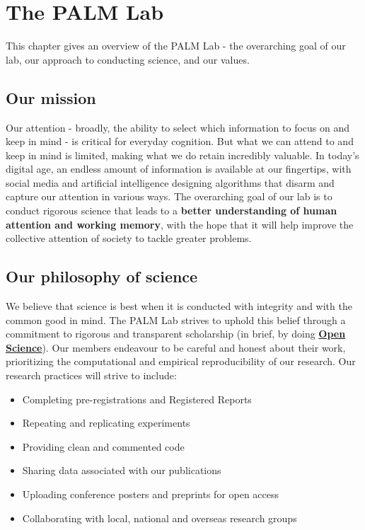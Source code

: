 \documentclass[
]{book}
\providecommand{\tightlist}{%
  \setlength{\itemsep}{0pt}\setlength{\parskip}{0pt}}
\begin{document}
\hypertarget{the-lab}{%
\chapter{The PALM Lab}\label{the-lab}}

This chapter gives an overview of the PALM Lab - the overarching goal of our lab, our approach to conducting science, and our values.

\hypertarget{lab-mission}{%
\section{Our mission}\label{lab-mission}}

Our attention - broadly, the ability to select which information to focus on and keep in mind - is critical for everyday cognition. But what we can attend to and keep in mind is limited, making what we do retain incredibly valuable. In today's digital age, an endless amount of information is available at our fingertips, with social media and artificial intelligence designing algorithms that disarm and capture our attention in various ways. The overarching goal of our lab is to conduct rigorous science that leads to a \textbf{better understanding of human attention and working memory}, with the hope that it will help improve the collective attention of society to tackle greater problems.

\hypertarget{lab-philosophy}{%
\section{Our philosophy of science}\label{lab-philosophy}}

We believe that science is best when it is conducted with integrity and with the common good in mind. The PALM Lab strives to uphold this belief through a commitment to rigorous and transparent scholarship (in brief, by doing \protect\hyperlink{open-science}{\textbf{Open Science}}). Our members endeavour to be careful and honest about their work, prioritizing the computational and empirical reproducibility of our research. Our research practices will strive to include:

\begin{itemize}
\tightlist
\item
  Completing pre-registrations and Registered Reports
\item
  Repeating and replicating experiments
\item
  Providing clean and commented code
\item
  Sharing data associated with our publications
\item
  Uploading conference posters and preprints for open access
\item
  Collaborating with local, national and overseas research groups
\end{itemize}
\end{document}
